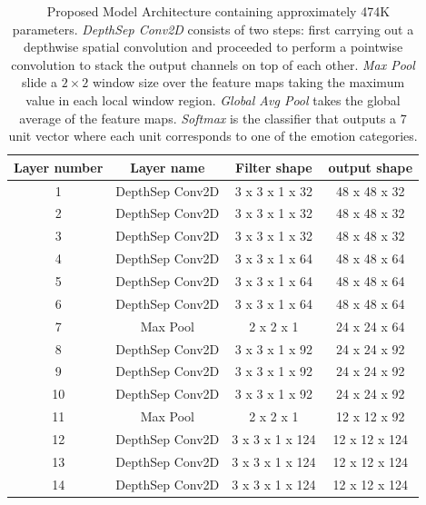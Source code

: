 \documentclass[master]{thesis-uestc}
\begin{document}
\begin{table}[ht]
\renewcommand{\arraystretch}{1}
\caption{\,\,\,\,\,Proposed Model Architecture containing approximately 474K parameters. \textit{DepthSep Conv2D} consists of two steps: first carrying out a depthwise spatial convolution and proceeded to perform a pointwise convolution to stack the output channels on top of each other. \textit{Max Pool} slide a $2 \times 2$ window size over the feature maps taking the maximum value in each local window region. \textit{Global Avg Pool} takes the global average of the feature maps. \textit{Softmax} is the classifier that outputs a 7 unit vector where each unit corresponds to one of the emotion categories.}
\label{model_arch}
\begin{center}
\begin{tabular}{|c|c|c|c|}
\hline
\textbf{Layer number} & \textbf{Layer name} & \textbf{Filter shape} & \textbf{output shape}\\ \hline
1 & DepthSep Conv2D & 3 x 3 x 1 x 32 & 48 x 48 x 32\\ \hline
2 & DepthSep Conv2D & 3 x 3 x 1 x 32 & 48 x 48 x 32\\ \hline
3 & DepthSep Conv2D & 3 x 3 x 1 x 32 & 48 x 48 x 32\\  \hline

4 & DepthSep Conv2D & 3 x 3 x 1 x 64 & 48 x 48 x 64\\ \hline
5 & DepthSep Conv2D & 3 x 3 x 1 x 64 & 48 x 48 x 64\\ \hline
6 & DepthSep Conv2D & 3 x 3 x 1 x 64 & 48 x 48 x 64\\  \hline

7 & Max Pool & 2 x 2 x 1 & 24 x 24 x 64\\ \hline

8 & DepthSep Conv2D & 3 x 3 x 1 x 92 & 24 x 24 x 92\\ \hline
9 & DepthSep Conv2D & 3 x 3 x 1 x 92 & 24 x 24 x 92\\ \hline
10 & DepthSep Conv2D & 3 x 3 x 1 x 92 & 24 x 24 x 92\\ \hline

11 & Max Pool & 2 x 2 x 1 & 12 x 12 x 92\\ \hline

12 & DepthSep Conv2D & 3 x 3 x 1 x 124 & 12 x 12 x 124\\ \hline
13 & DepthSep Conv2D & 3 x 3 x 1 x 124 & 12 x 12 x 124\\ \hline
14 & DepthSep Conv2D & 3 x 3 x 1 x 124 & 12 x 12 x 124\\ \hline


\end{tabular}
\end{center}
\end{table}
\end{document}
